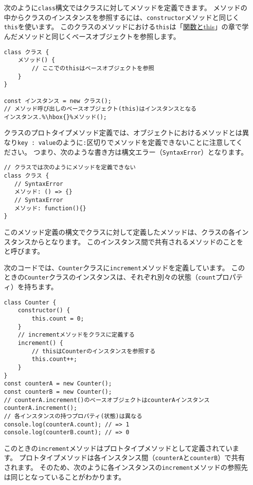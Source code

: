 次のように\texttt{class}構文ではクラスに対してメソッドを定義できます。
メソッドの中からクラスのインスタンスを参照するには、\texttt{constructor}メソッドと同じく\texttt{this}を使います。
このクラスのメソッドにおける\texttt{this}は「\hyperlink{function-this}{関数とthis}」の章で学んだメソッドと同じくベースオブジェクトを参照します。

\begin{lstlisting}[escapechar=\%]
class クラス {
    メソッド() {
        // ここでのthisはベースオブジェクトを参照
    }
}

const インスタンス = new クラス();
// メソッド呼び出しのベースオブジェクト(this)はインスタンスとなる
インスタンス.%\hbox{}%メソッド();
\end{lstlisting}

クラスのプロトタイプメソッド定義では、オブジェクトにおけるメソッドとは異なり\texttt{key : value}のように\texttt{:}区切りでメソッドを定義できないことに注意してください。
つまり、次のような書き方は構文エラー（\texttt{SyntaxError}）となります。

\begin{lstlisting}
// クラスでは次のようにメソッドを定義できない
class クラス {
   // SyntaxError
   メソッド: () => {}
   // SyntaxError
   メソッド: function(){}
}
\end{lstlisting}

このメソッド定義の構文でクラスに対して定義したメソッドは、クラスの各インスタンスから\textbf{}となります。
このインスタンス間で共有されるメソッドのことを\textbf{}と呼びます。

次のコードでは、\texttt{Counter}クラスに\texttt{increment}メソッドを定義しています。
このときの\texttt{Counter}クラスのインスタンスは、それぞれ別々の状態（\texttt{count}プロパティ）を持ちます。

\begin{lstlisting}
class Counter {
    constructor() {
        this.count = 0;
    }
    // incrementメソッドをクラスに定義する
    increment() {
        // thisはCounterのインスタンスを参照する
        this.count++;
    }
}
const counterA = new Counter();
const counterB = new Counter();
// counterA.increment()のベースオブジェクトはcounterAインスタンス
counterA.increment();
// 各インスタンスの持つプロパティ(状態)は異なる
console.log(counterA.count); // => 1
console.log(counterB.count); // => 0
\end{lstlisting}

このときの\texttt{increment}メソッドはプロトタイプメソッドとして定義されています。
プロトタイプメソッドは各インスタンス間（\texttt{counterA}と\texttt{counterB}）で共有されます。
そのため、次のように各インスタンスの\texttt{increment}メソッドの参照先は同じとなっていることがわかります。

